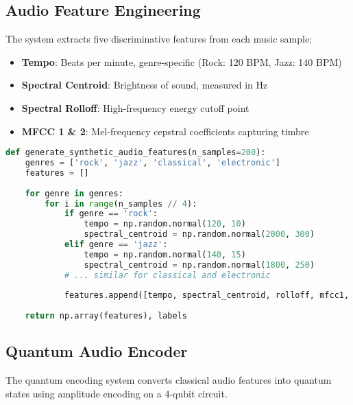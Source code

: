 \documentclass[11pt,a4paper]{article}
\begin{document}
\subsection{Audio Feature Engineering}

The system extracts five discriminative features from each music sample:

\begin{itemize}
    \item \textbf{Tempo}: Beats per minute, genre-specific (Rock: 120 BPM, Jazz: 140 BPM)
    \item \textbf{Spectral Centroid}: Brightness of sound, measured in Hz
    \item \textbf{Spectral Rolloff}: High-frequency energy cutoff point
    \item \textbf{MFCC 1 \& 2}: Mel-frequency cepstral coefficients capturing timbre
\end{itemize}

\begin{lstlisting}[language=Python, caption=Feature Extraction Implementation]
def generate_synthetic_audio_features(n_samples=200):
    genres = ['rock', 'jazz', 'classical', 'electronic']
    features = []
    
    for genre in genres:
        for i in range(n_samples // 4):
            if genre == 'rock':
                tempo = np.random.normal(120, 10)
                spectral_centroid = np.random.normal(2000, 300)
            elif genre == 'jazz':
                tempo = np.random.normal(140, 15)
                spectral_centroid = np.random.normal(1800, 250)
            # ... similar for classical and electronic
            
            features.append([tempo, spectral_centroid, rolloff, mfcc1, mfcc2])
    
    return np.array(features), labels
\end{lstlisting}

\subsection{Quantum Audio Encoder}

The quantum encoding system converts classical audio features into quantum states using amplitude encoding on a 4-qubit circuit.
\end{document}
